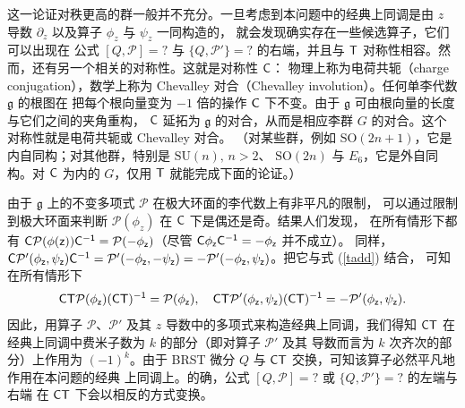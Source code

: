 这一论证对秩更高的群一般并不充分。一旦考虑到本问题中的经典上同调是由 $z$ 导数 $\partial_z$ 以及算子 $\phi_z$ 与 $\psi_z$ 一同构造的，
就会发现确实存在一些候选算子，它们可以出现在
公式 $[Q,\mathcal P]=?$ 与 $\{Q,\mathcal P'\}=?$ 的右端，并且与 $\sf T$ 对称性相容。然而，还有另一个相关的对称性。这就是对称性 $\sf C$：
物理上称为电荷共轭（charge conjugation），数学上称为 Chevalley 对合（Chevalley involution）。任何单李代数 $\mathfrak g$ 的根图在
把每个根向量变为 $-1$ 倍的操作 $\sf C$ 下不变。由于 $\mathfrak g$
可由根向量的长度与它们之间的夹角重构，
$\sf C$ 延拓为 $\mathfrak g$ 的对合，从而是相应李群 $G$ 的对合。这个对称性就是电荷共轭或 Chevalley 对合。
（对某些群，例如 ${\mathrm{SO}}(2n+1)$，它是内自同构；对其他群，特别是 ${\mathrm{SU}}(n),\,n>2$、
${\mathrm{SO}}(2n)$ 与 $E_6$，它是外自同构。对 $\sf C$ 为内的 $G$，仅用 $\sf T$ 就能完成下面的论证。）

由于 $\mathfrak g$ 上的不变多项式 $\mathcal P$ 在极大环面的李代数上有非平凡的限制，
可以通过限制到极大环面来判断 $\mathcal P(\phi_z)$ 在 $\sf C$ 下是偶还是奇。结果人们发现，
在所有情形下都有 $\sf C \mathcal P(\phi(z)) \sf C^{-1}=\mathcal P(-\phi_z)$（尽管 $\sf C \phi_z\sf C^{-1}=-\phi_z$ 并不成立）。
同样，
$\sf C\mathcal P'(\phi_z,\psi_z)\sf C^{-1} =\mathcal P'(-\phi_z,-\psi_z)=-\mathcal P'(-\phi_z,\psi_z)$。把它与式 (\ref{tadd}) 结合，
可知在所有情形下
\begin{equation}\label{wadd} \sf C\sf T \mathcal P(\phi_z)(\sf C\sf T)^{-1}=\mathcal P(\phi_z),~~~
  \sf C\sf T \mathcal P'(\phi_z,\psi_z)(\sf C\sf T)^{-1}=-\mathcal P'(\phi_z,\psi_z). \end{equation}
因此，用算子 $\mathcal P$、$\mathcal P'$ 及其 $z$ 导数中的多项式来构造经典上同调，我们得知 $\sf C\sf T$
在经典上同调中费米子数为 $k$ 的部分（即对算子 $\mathcal P'$ 及其
导数而言为 $k$ 次齐次的部分）上作用为 $(-1)^k$。由于 BRST 微分 $Q$ 与 $\sf C\sf T$ 交换，可知该算子必然平凡地作用在本问题的经典
上同调上。的确，公式 $[Q,\mathcal P]=?$ 或 $\{Q,\mathcal P'\}=?$ 的左端与右端
在 $\sf C\sf T$ 下会以相反的方式变换。

